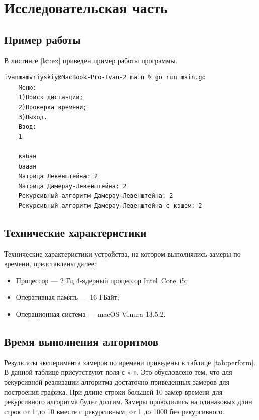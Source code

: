 \chapter{Исследовательская часть}

\section{Пример работы}

В листинге \ref{lst:ex} приведен пример работы программы. 
\begin{lstlisting}[label=lst:ex,caption=Функция нахождения расстояния Дамерау-Левенштейна нерекурсивным способом]
    ivanmamvriyskiy@MacBook-Pro-Ivan-2 main % go run main.go 
    Меню:
    1)Поиск дистанции;
    2)Проверка времени;
    3)Выход.
    Ввод: 
    1
    
    кабан
    бааан
    Матрица Левенштейна: 2
    Матрица Дамерау-Левенштейна: 2
    Рекурсивный алгоритм Дамерау-Левенштейна: 2
    Рекурсивный алгоритм Дамерау-Левенштейна с кэшем: 2
\end{lstlisting}

\section{Технические характеристики}

Технические характеристики устройства, на котором выполнялись замеры по времени, представлены далее:

\begin{itemize}
	\item Процессор --- 2 Гц 4‑ядерный процессор Intel Core i5;
	\item Оперативная память --- 16 ГБайт;
	\item Операционная система --- macOS Venura 13.5.2. 
\end{itemize}

\clearpage

\section{Время выполнения алгоритмов}

Результаты эксперимента замеров по времени приведены в таблице \ref{tab:perform}. В данной
таблице присутствуют поля с «-». Это обусловлено тем, что для 
рекурсивной реализации алгоритма достаточно приведенных замеров для 
построения графика. При длине строки большей 10 замер времени для рекурсивного
алгоритма будет долгим.
Замеры проводились на одинаковых длин строк от 1 до 10 вместе с рекурсивным, от 1 до 1000 без рекурсивного.


